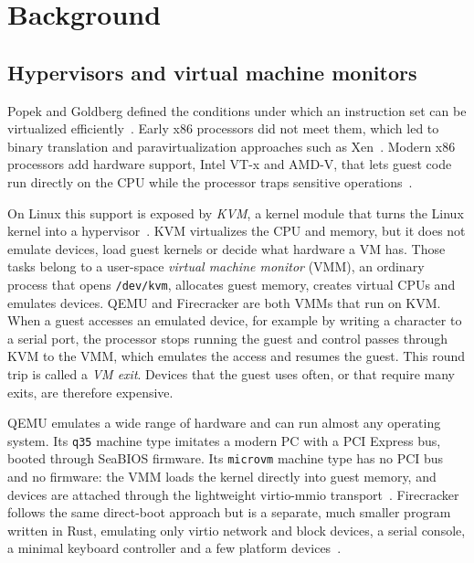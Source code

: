 \documentclass[pdflatex,sn-mathphys-num]{sn-jnl}%
\begin{document}
\section{Background}\label{sec:background}

\subsection{Hypervisors and virtual machine monitors}

Popek and Goldberg defined the conditions under which an instruction set can be virtualized efficiently~\cite{popek1974}. Early x86 processors did not meet them, which led to binary translation and paravirtualization approaches such as Xen~\cite{barham2003xen}. Modern x86 processors add hardware support, Intel VT-x and AMD-V, that lets guest code run directly on the CPU while the processor traps sensitive operations~\cite{uhlig2005vt}.

On Linux this support is exposed by \emph{KVM}, a kernel module that turns the Linux kernel into a hypervisor~\cite{kivity2007kvm}. KVM virtualizes the CPU and memory, but it does not emulate devices, load guest kernels or decide what hardware a VM has. Those tasks belong to a user-space \emph{virtual machine monitor} (VMM), an ordinary process that opens \texttt{/dev/kvm}, allocates guest memory, creates virtual CPUs and emulates devices. QEMU and Firecracker are both VMMs that run on KVM. When a guest accesses an emulated device, for example by writing a character to a serial port, the processor stops running the guest and control passes through KVM to the VMM, which emulates the access and resumes the guest. This round trip is called a \emph{VM exit}. Devices that the guest uses often, or that require many exits, are therefore expensive.

QEMU emulates a wide range of hardware and can run almost any operating system. Its \texttt{q35} machine type imitates a modern PC with a PCI Express bus, booted through SeaBIOS firmware. Its \texttt{microvm} machine type has no PCI bus and no firmware: the VMM loads the kernel directly into guest memory, and devices are attached through the lightweight virtio-mmio transport~\cite{qemumicrovm,russell2008virtio}. Firecracker follows the same direct-boot approach but is a separate, much smaller program written in Rust, emulating only virtio network and block devices, a serial console, a minimal keyboard controller and a few platform devices~\cite{agache2020firecracker}.
\end{document}

